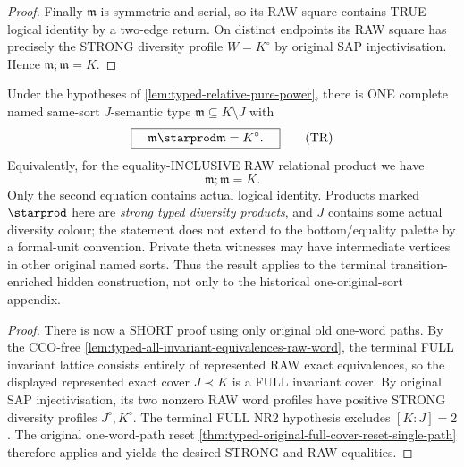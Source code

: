 \begin{proof}
Finally $\mathfrak m$ is
symmetric and serial, so its
RAW square contains TRUE
logical identity by a two-edge
return. On distinct endpoints
its RAW square has precisely
the STRONG diversity profile
$W=K^\circ$ by original SAP
injectivisation. Hence
$\mathfrak m;\mathfrak m=K$.
\end{proof}

\begin{theorem}
\label{thm:typed-relative-reset}
Under the hypotheses of
\cref{lem:typed-relative-pure-power}, there is
ONE complete named same-sort $J$-semantic
type $\mathfrak m\subseteq K\setminus J$ with
\[
                 \boxed{\quad
      \mathfrak m\starprod\mathfrak m=K^\circ.\quad}
 \tag{TR}\label{eq:typed-relative-reset}
\]
Equivalently, for the equality-INCLUSIVE
RAW relational product we have
\[
       \mathfrak m;\mathfrak m=K.
 \tag{TR-RAW}\label{eq:typed-relative-reset-raw}
\]
Only the second equation contains
actual logical identity. Products
marked \(\starprod\) here are
\emph{strong typed diversity products},
and $J$ contains some actual diversity colour;
the statement does not extend to the bottom/equality
palette by a formal-unit convention.
Private theta witnesses may have intermediate vertices
in other original named sorts. Thus the result applies
to the terminal transition-enriched hidden construction,
not only to the historical one-original-sort appendix.
\end{theorem}
\begin{proof}
There is now a SHORT proof using only original
old one-word paths. By the CCO-free
\cref{lem:typed-all-invariant-equivalences-raw-word},
the terminal FULL invariant lattice consists
entirely of represented RAW exact equivalences,
so the displayed represented exact cover
$J\prec K$ is a FULL invariant cover.
By original SAP injectivisation, its two
nonzero RAW word profiles have positive
STRONG diversity profiles $J^\circ,K^\circ$.
The terminal FULL NR2 hypothesis excludes
$[K:J]=2$. The original one-word-path reset
\cref{thm:typed-original-full-cover-reset-single-path}
therefore applies and yields the desired
STRONG and RAW equalities.

\end{proof}

